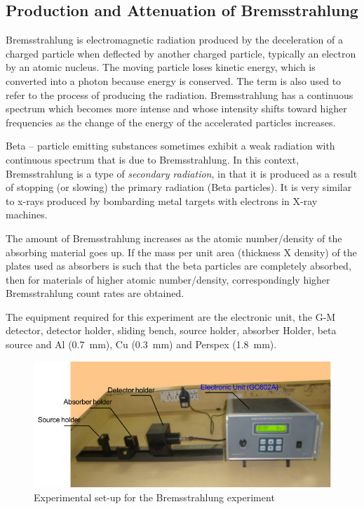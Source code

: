 \documentclass[%
 reprint,
nofootinbib,
 amsmath,amssymb,
 aps,
floatfix,
]{revtex4-2}
\begin{document}
    \subsection{Production and Attenuation of Bremsstrahlung}
        Bremsstrahlung is electromagnetic radiation produced by the deceleration of a charged particle when deflected by another charged particle, typically an electron by an atomic nucleus. The moving particle loses kinetic energy, which is converted into a photon because energy is conserved. The term is also used to refer to the process of producing the radiation. Bremsstrahlung has a continuous spectrum which becomes more intense and whose intensity shifts toward higher frequencies as the change of the energy of the accelerated particles increases.
        \par
        Beta – particle emitting substances sometimes exhibit a weak radiation with continuous spectrum that is due to Bremsstrahlung. In this context, Bremsstrahlung is a type of \textit{secondary radiation}, in that it is produced as a result of stopping (or slowing) the primary radiation (Beta particles). It is very similar to x-rays produced by bombarding metal targets with electrons in X-ray machines.
        \par
        The amount of Bremsstrahlung increases as the atomic number/density of the absorbing material goes up. If the mass per unit area (thickness X density) of the plates used as absorbers is such that the beta particles are completely absorbed, then for materials of higher atomic number/density, correspondingly higher Bremsstrahlung count rates are obtained.
        \par
        The equipment required for this experiment are the electronic unit, the G-M detector, detector holder, sliding bench, source holder, absorber Holder, beta source and Al (\SI{0.7}{\milli \metre}), Cu (\SI{0.3}{\milli \metre}) and Perspex (\SI{1.8}{\milli \metre}).
        \begin{figure}
            \centering
            \includegraphics[scale = 0.6]{Figures/brem.png}
            \caption{Experimental set-up for the Bremsstrahlung experiment}
            \label{fig:brem}
        \end{figure}
\end{document}
